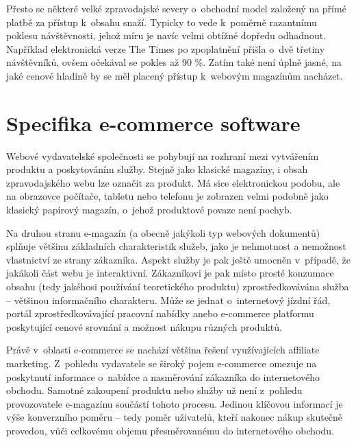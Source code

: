 \documentclass[12pt,twoside,openany]{fithesis}
\makeatletter
\def\cleardoublepage{\clearpage\if@twoside \ifodd\c@page\else
        \thispagestyle{empty}
        \hbox{}\newpage\if@twocolumn\hbox{}\newpage\fi\fi\fi}
\makeatother
\begin{document}
Přesto se některé velké zpravodajské severy o~obchodní model založený 
na přímé platbě za přístup k~obsahu snaží. Typicky to vede k~poměrně 
razantnímu poklesu návštěvnosti, jehož míru je navíc velmi obtížné 
dopředu odhadnout. Například elektronická verze The Times po zpoplatnění 
přišla o~dvě třetiny návštěvníků, ovšem očekával se pokles až 90 
\%. \cite{times-reuters}{} Zatím také není úplně jasné, na jaké cenové 
hladině by se měl placený přístup k~webovým magazínům nacházet.

\cleardoublepage\chapter{Specifika e-commerce software}
\label{chap-ecom-soft}\hypertarget{chap-ecom-soft}{}%

Webové vydavatelské společnosti se pohybují na rozhraní mezi vytvářením 
produktu a poskytováním služby. Stejně jako klasické magazíny, i obsah 
zpravodajského webu lze označit za produkt. Má sice elektronickou podobu, 
ale na obrazovce počítače, tabletu nebo telefonu je zobrazen velmi podobně 
jako klasický papírový magazín, o~jehož produktové povaze není pochyb.

Na druhou stranu e-magazín (a obecně jakýkoli typ webových dokumentů) 
splňuje většinu základních charakteristik služeb, jako je nehmotnost a 
nemožnost vlastnictví ze strany zákazníka. Aspekt služby je pak ještě 
umocněn v~případě, že jakákoli část webu je interaktivní. 
Zákazníkovi je pak místo prosté konzumace obsahu (tedy jakéhosi 
používání teoretického produktu) zprostředkovávána služba -- 
většinou informačního charakteru. Může se jednat o~internetový jízdní 
řád, portál zprostředkovávající pracovní nabídky anebo e-commerce 
platformu poskytující cenové srovnání a možnost nákupu různých 
produktů.

Právě v~oblasti e-commerce se nachází většina řešení využívajících 
affiliate marketing. Z~pohledu vydavatele se široký pojem e-commerce omezuje 
na poskytnutí informace o~nabídce a nasměrování zákazníka do 
internetového obchodu. Samotné zakoupení produktu nebo služby už není 
z~pohledu provozovatele e-magazínu součástí tohoto procesu. Jedinou 
klíčovou informací je výše konverzního poměru -- tedy poměr 
uživatelů, kteří nakonec nákup skutečně provedou, vůči celkovému 
objemu přesměrovanému do internetového obchodu.
\end{document}
